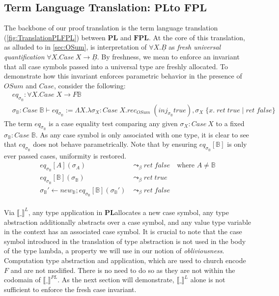 \documentclass[acmsmall]{acmart}
\newcommand{\den}[1]{\llbracket #1\rrbracket}
\newcommand{\pl}{$\mathbf{PL}$}
\newcommand{\fpl}{$\mathbf{FPL}$}
\begin{document}
\subsection{Term Language Translation: \pl\;to \fpl}\label{sec:TermLangTranslation}
The backbone of our proof translation is the term language translation (\cref{fig:TranslationPLFPL}) between \pl\; and \fpl. At the core of this translation, as alluded to in \cref{sec:OSum}, is interpretation of $\forall X. \underline{B}$ as \emph{fresh universal quantification} $\forall X. Case\:X \to \underline{B}$. By freshness, we mean to enforce an invariant that all case symbols passed into a universal type are freshly allocated. To demonstrate how this invariant enforces parametric behavior in the presence of $OSum$ and $Case$, consider the following:
\begin{align*}
  &eq_{\sigma_{\mathbb{B}}} : \forall X. Case\;X \to F \mathbb{B}\\
  &\sigma_{\mathbb{B}}: Case\;\mathbb{B}\vdash eq_{\sigma_{\mathbb{B}}} := \Lambda X. \lambda \sigma_X: Case\;X .rec_{OSum}\; (inj_{\sigma_{\mathbb{B}}} true),\sigma_X \; \{x.\;ret\;true\;|\; ret\;false\} 
\end{align*}
The term $eq_{\sigma_{\mathbb{B}}}$ is a case equality test comparing any given $\sigma_X:Case\:X$ to a fixed $\sigma_{\mathbb{B}}:Case\;\mathbb{B}$. As any case symbol is only associated with one type, it is clear to see that $eq_{\sigma_{\mathbb{B}}}$ does not behave parametrically. Note that by ensuring $eq_{\sigma_{\mathbb{B}}}[\mathbb{B}]$ is only ever passed  cases, uniformity is restored.
\begin{align*}
  eq_{\sigma_{\mathbb{B}}}[A](\sigma_A) &\leadsto_{\beta} ret\;false \quad\text{where } A\neq \mathbb{B}\\
  eq_{\sigma_{\mathbb{B}}}[\mathbb{B}](\sigma_{\mathbb{B}}) &\leadsto_{\beta} ret\;true\\
  \sigma_{\mathbb{B}}' \leftarrow new_{\mathbb{B}};eq_{\sigma_{\mathbb{B}}}[\mathbb{B}](\sigma_{\mathbb{B}}') &\leadsto_{\beta} ret\;false\quad\\
\end{align*} 

Via $\den{\_}^L$, any type application in \pl\;allocates a new case symbol, any type abstraction additionally abstracts over a case symbol, and any value type variable in the context has an associated case symbol. It is crucial to note that the case symbol introduced in the translation of type abstraction is not used in the body of the type lambda, a property we will use in our notion of \emph{obliviousness}. Computation type abstraction and application, which are used to church encode $F$ and are not modified. There is no need to do so as they are not within the codomain of $\den{\_}^{PL}$. As the next section will demonstrate, $\den{\_}^L$ alone is not sufficient to enforce the fresh case invariant. 
\end{document}
